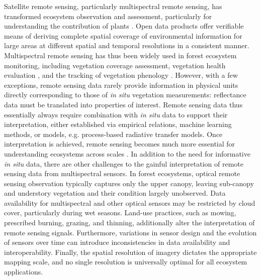 \documentclass[pdflatex,sn-mathphys-num]{sn-jnl}%
\theoremstyle{thmstyleone}%
\theoremstyle{thmstyletwo}%
\theoremstyle{thmstylethree}%
\begin{document}
Satellite remote sensing, particularly multispectral remote sensing, has transformed ecosystem observation and assessment, particularly for understanding the contribution of plants \cite{andrew2014potential,pettorelli2018satellite}. 
Open data products offer verifiable means of deriving complete spatial coverage of environmental information for large areas at different spatial and temporal resolutions in a consistent manner. Multispectral remote sensing has thus been widely used in forest ecosystem monitoring, including vegetation coverage assessment, vegetation health evaluation \cite{zarco2019chlorophyll,brown2025grounded,cherif2022deepforest}, and the tracking of vegetation phenology \cite{dronova2022remote}. However, with a few exceptions, remote sensing data rarely provide information in physical units directly corresponding to those of \textit{in situ} vegetation measurements: reflectance data must be translated into properties of interest. Remote sensing data thus essentially always require combination with \textit{in situ} data to support their interpretation, either established via empirical relations, machine learning methods, or models, e.g. process-based radiative transfer models. Once interpretation is achieved, remote sensing becomes much more essential for understanding ecosystems across scales \cite{cavender2025spectral}. 
In addition to the need for informative \textit{in situ} data, there are other challenges to the gainful interpretation of remote sensing data from multispectral sensors. In forest ecosystems, optical remote sensing observation typically captures only the upper canopy, leaving sub-canopy and understory vegetation and their condition largely unobserved. Data availability for multispectral and other optical sensors may be restricted by cloud cover, particularly during wet seasons. Land-use practices, such as mowing, prescribed burning, grazing, and thinning, additionally alter the interpretation of remote sensing signals. Furthermore, variations in sensor design and the evolution of sensors over time can introduce inconsistencies in data availability and interoperability. Finally, the spatial resolution of imagery dictates the appropriate mapping scale, and no single resolution is universally optimal for all ecosystem applications.
\end{document}
